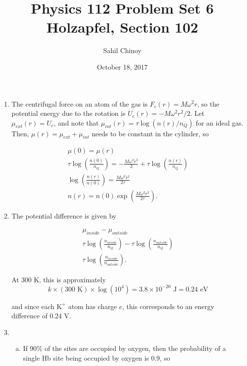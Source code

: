 \documentclass{article}
\title{Physics 112 Problem Set 6 \\ \large{Holzapfel, Section 102}}
\author{Sahil Chinoy}
\date{October 18, 2017}
\begin{document}
\maketitle{}

\begin{enumerate}

	\item

	The centrifugal force on an atom of the gas is $F_c(r) = M\omega^2 r$, so the potential energy due to the rotation is $U_c(r) = - M \omega^2 r^2 / 2.$ Let $\mu_{ext}(r) = U_c$, and note that $\mu_{int}(r)  = \tau \log(n(r)/n_{Q})$ for an ideal gas. Then, $\mu(r) = \mu_{ext} + \mu_{int}$ needs to be constant in the cylinder, so

	\begin{gather*}
	\mu(0) = \mu(r) \\
	\tau \log \left( \frac{n(0)}{n_Q} \right) = - \frac{M \omega^2 r^2}{2} +  \tau \log \left( \frac{n(r)}{n_Q} \right) \\
	\log \left( \frac{n(r)}{n(0)} \right) = \frac{M \omega^2 r^2}{2 \tau} \\
	n(r) = n(0) \exp \left( \frac{M \omega^2 r^2}{2 \tau} \right).
	\end{gather*}

	\item

	The potential difference is given by

	\begin{gather*}
	\mu_{inside} - \mu_{outside} \\
	\tau \log \left( \frac{n_{inside}}{n_Q} \right) - \tau \log\left( \frac{n_{outside}}{n_Q} \right) \\
	\tau \log \left( \frac{n_{inside}}{n_{outside}} \right).
	\end{gather*}

	At 300 K, this is approximately
	$$
	k \times (300 \text{ K}) \times \log (10^4) = 3.8 \times 10^{-20} \text{ J} = 0.24 \text{ eV} 
	$$

	and since each $\text{K}^+$ atom has charge $e$, this corresponds to an energy difference of 0.24 V.

	\item

	\begin{enumerate}[(a)]

		\item

		If 90\% of the sites are occupied by oxygen, then the probability of a single Hb site being occupied by oxygen is 0.9, so


\end{enumerate}
\end{enumerate}
\end{document}
